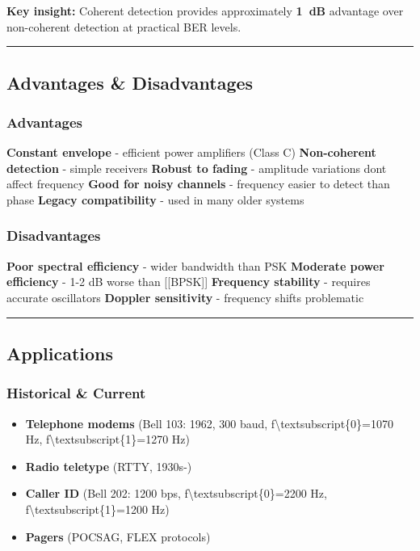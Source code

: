 \textbf{Key insight:} Coherent detection provides approximately \textbf{1~dB} advantage over non-coherent detection at practical BER levels.

\begin{center}\rule{0.5\linewidth}{0.5pt}\end{center}

\subsection{\texorpdfstring{ Advantages \&
Disadvantages}{ Advantages \& Disadvantages}}\label{advantages-disadvantages}

\subsubsection{Advantages}\label{advantages}

\textbf{Constant envelope} - efficient power amplifiers (Class C)
\textbf{Non-coherent detection} - simple receivers \textbf{Robust to
fading} - amplitude variations don\textquotesingle t affect frequency
\textbf{Good for noisy channels} - frequency easier to detect than phase
\textbf{Legacy compatibility} - used in many older systems

\subsubsection{Disadvantages}\label{disadvantages}

\textbf{Poor spectral efficiency} - wider bandwidth than PSK
\textbf{Moderate power efficiency} - 1-2 dB worse than {[}{[}BPSK{]}{]}
\textbf{Frequency stability} - requires accurate oscillators
\textbf{Doppler sensitivity} - frequency shifts problematic

\begin{center}\rule{0.5\linewidth}{0.5pt}\end{center}

\subsection{\texorpdfstring{
Applications}{ Applications}}\label{applications}

\subsubsection{Historical \& Current}\label{historical-current}

\begin{itemize}
\tightlist
\item
  \textbf{Telephone modems} (Bell 103: 1962, 300 baud,
  f\textbackslash textsubscript\{0\}=1070 Hz,
  f\textbackslash textsubscript\{1\}=1270 Hz)
\item
  \textbf{Radio teletype} (RTTY, 1930s-)
\item
  \textbf{Caller ID} (Bell 202: 1200 bps,
  f\textbackslash textsubscript\{0\}=2200 Hz,
  f\textbackslash textsubscript\{1\}=1200 Hz)
\item
  \textbf{Pagers} (POCSAG, FLEX protocols)
\end{itemize}

